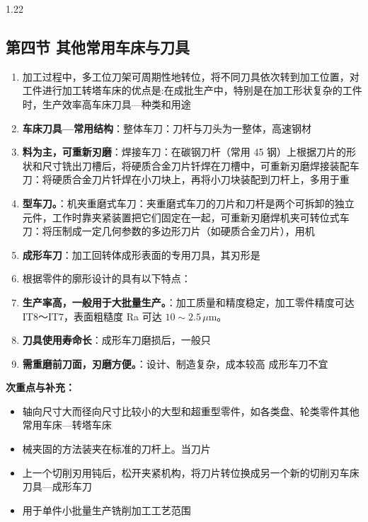 \documentclass[12pt,a4paper]{article}
\begin{document}
\begin{spacing}{1.22}
\subsection{第四节 其他常用车床与刀具}
\begin{tcolorbox}[colback=yellow!6,colframe=red!55!black,title=重点,left=1mm,right=1mm]
\begin{enumerate}[leftmargin=2.2em,label=\arabic*.]
  \item 加工过程中，多工位刀架可周期性地转位，将不同刀具依次转到加工位置，对工件进行加工转塔车床的优点是:在成批生产中，特别是在加工形状复杂的工件时，生产效率高车床刀具—种类和用途
  \item \textbf{车床刀具—常用结构}：整体车刀：刀杆与刀头为一整体，高速钢材
  \item \textbf{料为主，可重新刃磨}：焊接车刀：在碳钢刀杆（常用 45 钢）上根据刀片的形状和尺寸铣出刀槽后，将硬质合金刀片钎焊在刀槽中，可重新刃磨焊接装配车刀：将硬质合金刀片钎焊在小刀块上，再将小刀块装配到刀杆上，多用于重
  \item \textbf{型车刀。}：机夹重磨式车刀：夹重磨式车刀的刀片和刀杆是两个可拆卸的独立元件，工作时靠夹紧装置把它们固定在一起，可重新刃磨焊机夹可转位式车刀：将压制成一定几何参数的多边形刀片（如硬质合金刀片），用机
  \item \textbf{成形车刀}：加工回转体成形表面的专用刀具，其刃形是
  \item 根据零件的廓形设计的具有以下特点：
  \item \textbf{生产率高，一般用于大批量生产。}：加工质量和精度稳定，加工零件精度可达 IT8～IT7，表面粗糙度 Ra 可达 $10\sim2.5\,\mu\text{m}$。
  \item \textbf{刀具使用寿命长}：成形车刀磨损后，一般只
  \item \textbf{需重磨前刀面，刃磨方便。}：设计、制造复杂，成本较高 成形车刀不宜
\end{enumerate}
\end{tcolorbox}
\noindent\textbf{次重点与补充：}
\begin{itemize}[leftmargin=2.2em,label=--]
  \item 轴向尺寸大而径向尺寸比较小的大型和超重型零件，如各类盘、轮类零件其他常用车床—转塔车床
  \item 械夹固的方法装夹在标准的刀杆上。当刀片
  \item 上一个切削刃用钝后，松开夹紧机构，将刀片转位换成另一个新的切削刃车床刀具—成形车刀
  \item 用于单件小批量生产铣削加工工艺范围
\end{itemize}


\end{spacing}
\end{document}
